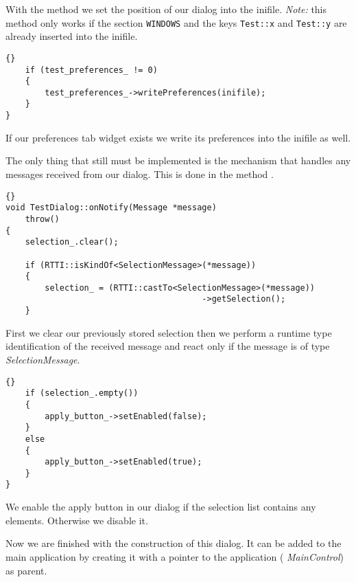 With the method  we set the position of our dialog into the inifile.
{\em Note:} this method only works if the section {\tt WINDOWS} and the keys
{\tt Test::x} and {\tt Test::y} are already inserted into the inifile.
\begin{lstlisting}{}
	if (test_preferences_ != 0)
	{
		test_preferences_->writePreferences(inifile);
	}
}
\end{lstlisting}
If our preferences tab widget exists we write its preferences into the inifile
as well.

The only thing that still must be implemented is the mechanism that handles
any messages received from our dialog. This is done in the method
. 
\begin{lstlisting}{}
void TestDialog::onNotify(Message *message)
	throw()
{
	selection_.clear();

	if (RTTI::isKindOf<SelectionMessage>(*message))
	{
		selection_ = (RTTI::castTo<SelectionMessage>(*message))
										->getSelection();
	}
\end{lstlisting}
First we clear our previously stored selection then we perform a runtime type
identification of the received message and react only if the message is of
type {\em SelectionMessage}.
\begin{lstlisting}{}
	if (selection_.empty())
	{
		apply_button_->setEnabled(false);
	}
	else
	{
		apply_button_->setEnabled(true);
	}
}
\end{lstlisting}
We enable the apply button in our dialog if the selection list contains any
elements. Otherwise we disable it.

Now we are finished with the construction of this dialog. It can be added to
the main application by creating it with a pointer to the application ({\em
MainControl}) as parent.

